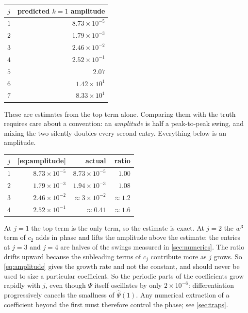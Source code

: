 \documentclass[11pt,oneside]{article}
\theoremstyle{definition}
\theoremstyle{remark}
\newcommand{\Psihat}{\widehat\Psi}
\begin{document}
\begin{center}
\begin{tabular}{@{}cr@{}}
\toprule
$j$ & predicted $k=1$ amplitude\\
\midrule
$1$ & $8.73\times10^{-5}$\\
$2$ & $1.79\times10^{-3}$\\
$3$ & $2.46\times10^{-2}$\\
$4$ & $2.52\times10^{-1}$\\
$5$ & $2.07$\\
$6$ & $1.42\times10^{1}$\\
$7$ & $8.33\times10^{1}$\\
\bottomrule
\end{tabular}
\end{center}

These are estimates from the top term alone.  Comparing them with the truth
requires care about a convention: an \emph{amplitude} is half a
peak-to-peak swing, and mixing the two silently doubles every second
entry.  Everything below is an amplitude.

\begin{center}
\begin{tabular}{@{}crrr@{}}
\toprule
$j$ & \cref{eq:amplitude} & actual & ratio\\
\midrule
$1$ & $8.73\times10^{-5}$ & $8.73\times10^{-5}$ & $1.00$\\
$2$ & $1.79\times10^{-3}$ & $1.94\times10^{-3}$ & $1.08$\\
$3$ & $2.46\times10^{-2}$ & $\approx3\times10^{-2}$ & $\approx1.2$\\
$4$ & $2.52\times10^{-1}$ & $\approx0.41$ & $\approx1.6$\\
\bottomrule
\end{tabular}
\end{center}

At $j=1$ the top term is the only term, so the estimate is exact.  At
$j=2$ the $w^3$ term of $c_2$ adds in phase and lifts the amplitude above
the estimate; the entries at $j=3$ and $j=4$ are halves of the swings
measured in \cref{sec:numerics}.  The ratio drifts upward because the
subleading terms of $c_j$ contribute more as $j$ grows.  So
\cref{eq:amplitude} gives the growth rate and not the constant, and should
never be used to size a particular coefficient.  So the periodic parts of
the coefficients grow rapidly with $j$, even though $\Psi$ itself oscillates by
only $2\times10^{-6}$: differentiation progressively cancels the smallness of
$\Psihat(1)$.  Any numerical extraction of a coefficient beyond the first must
therefore control the phase; see \cref{sec:traps}.
\end{document}
